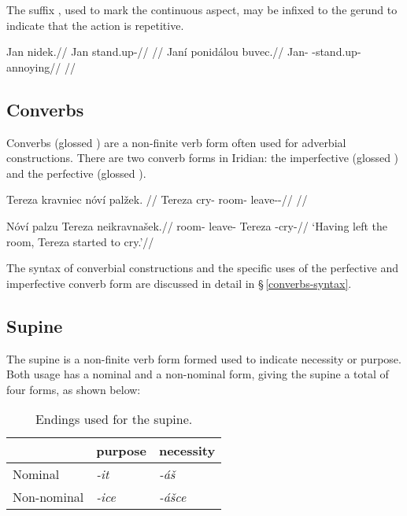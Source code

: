 The suffix , used to mark the continuous aspect, may be infixed to the gerund to indicate that the action is repetitive.

\pex
\a
\begingl
\gla Jan nidek.//
\glb Jan stand.up-//
\glft {}//
\endgl
\a
\begingl
\gla Janí ponidálou buvec.//
\glb Jan-\Gen{} -stand.up- annoying//
\glft {}//
\endgl
\xe

\subsection{Converbs}
Converbs (glossed \Cv{}) are a non-finite verb form often used for adverbial constructions. There are two converb forms in Iridian: the imperfective  (glossed ) and the perfective  (glossed ).

\pex
\begingl
\gla Tereza kravniec nóví palžek. //
\glb Tereza cry- room-\Gen{} leave-\Av{}-\Pf{}//
\glft {}//
\endgl
\xe

\pex
\begingl
\gla Nóví palzu Tereza neikravnašek.//
\glb room-\Gen{} leave- Tereza -cry-//
\glft `Having left the room, Tereza started to cry.'//
\endgl
\xe

The syntax of converbial constructions and the specific uses of the perfective and imperfective converb form are discussed in detail in \S\,\ref{converbs-syntax}.


\subsection{Supine}

The {\sc supine} is a non-finite verb form formed used to indicate necessity or purpose. Both usage has a nominal and a non-nominal form, giving the supine a total of four forms, as shown below:

\begin{table}[h!]
	\small
	\caption{Endings used for the supine.}
	\medskip
	\begin{tabu} to 0.6\textwidth{YYY}
		\toprule
		&{\sc purpose}&{\sc necessity}\\
		\midrule
		Nominal & \textit{-it} & \textit{-áš}\\
		Non-nominal & \textit{-ice} & \textit{-ášce}\\
		\bottomrule
	\end{tabu}
\end{table}

